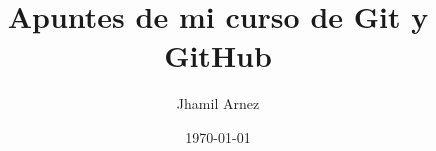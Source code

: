 \documentclass[a4paper,12pt]{book}
\begin{document}
\author{Jhamil Arnez}
\title{Apuntes de mi curso de Git y GitHub}
\date{\today}

\frontmatter
\maketitle
\tableofcontents

\mainmatter



\backmatter
\end{document}
